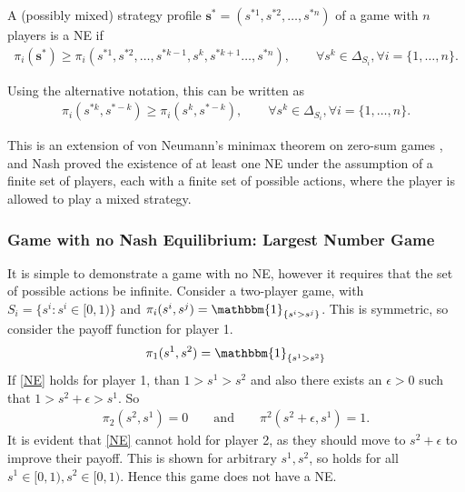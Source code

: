 A (possibly mixed) strategy profile $\mathbf{s^*} = (s^{*1}, s^{*2}, \dots, s^{*n})$ of a game with $n$ players is a NE if \\
\begin{align}
    \pi_i(\mathbf{s^*}) \geq \pi_i(s^{*1}, s^{*2},\dots, s^{*k-1}, s^{k}, s^{*k+1} \dots, s^{*n}), \qquad \forall  s^{k} \in \Delta_{ S_i}, \forall i =\{1, \dots, n\}. \label{NE}
\end{align}


Using the alternative notation, this can be written as \\
\begin{align*}
    \pi_i(s^{*k},s^{*-k}) \geq \pi_i(s^k,s^{*-k}), \qquad \forall  s^k \in \Delta_{ S_i}, \forall i =\{1, \dots, n\}.
\end{align*}

This is an extension of von Neumann's minimax theorem on zero-sum games \cite{RN99}, and Nash proved the existence of at least one NE under the assumption of a finite set of players, each with a finite set of possible actions, where the player is allowed to play a mixed strategy. \\


\subsubsection{Game with no Nash Equilibrium: Largest Number Game}
It is simple to demonstrate a game with no NE, however it requires that the set of possible actions be infinite. Consider a two-player game, with $S_i = \{s^i: s^i \in [0,1) \}$ and $\pi_i(s^i,s^j) = \mathbbm{1}_{\{s^i>s^j\}}$. This is symmetric, so consider the payoff function for player 1. \\
\begin{align*}
    \pi_1(s^1,s^2) = \mathbbm{1}_{\{s^1>s^2\}}
\end{align*}
If \eqref{NE} holds for player 1, than $1>s^1 >s^2$ and also there exists an $\epsilon>0$ such that $1>s^2 + \epsilon>s^1$. So \\
\begin{align*}
    \pi_2(s^2,s^1) = 0 \qquad \text{and} \qquad \pi^2(s^2 + \epsilon,s^1) = 1.
\end{align*}
It is evident that \eqref{NE} cannot hold for player 2, as they should move to $s^2 + \epsilon$ to improve their payoff. This is shown for arbitrary $s^1, s^2$, so holds for all $s^1 \in [0,1), s^2 \in [0,1)$. Hence this game does not have a NE. \\


